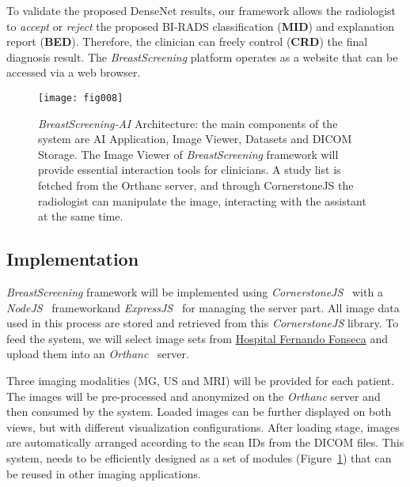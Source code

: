 To validate the proposed DenseNet results, our framework allows the radiologist to {\it accept} or {\it reject} the proposed BI-RADS classification ({\bf MID}) and explanation report ({\bf BED}).
Therefore, the clinician can freely control ({\bf CRD}) the final diagnosis result.
The {\it BreastScreening} platform operates as a website that can be accessed via a web browser.

\begin{figure}[htbp]
\centering
\texttt{[image: fig008]}
\caption{{\it BreastScreening-AI} Architecture: the main components of the system are AI Application, Image Viewer, Datasets and DICOM Storage. The Image Viewer of {\it BreastScreening} framework will provide essential interaction tools for clinicians. A study list is fetched from the Orthanc server, and through CornerstoneJS the radiologist can manipulate the image, interacting with the assistant at the same time.}
\label{fig:fig008}
\end{figure}

\subsection{Implementation}
\label{sec:sec00603}

{\it BreastScreening} framework will be implemented using {\it CornerstoneJS}\footnotemark[2]~\cite{urban2017lesiontracker} with a {\it NodeJS}~\cite{10.5555/3002437, drnasin2017javascript} framework\footnotemark[3] and {\it ExpressJS}\footnotemark[4]~\cite{10.1117/12.2285952} for managing the server part.
All image data used in this process are stored and retrieved from this {\it CornerstoneJS} library.
To feed the system, we will select image sets from \hyperlink{https://hff.min-saude.pt/}{Hospital Fernando Fonseca} and upload them into an {\it Orthanc}~\cite{Jodogne2018} server.

Three imaging modalities (MG, US and MRI) will be provided for each patient.
The images will be pre-processed and anonymized on the {\it Orthanc} server and then consumed by the system.
Loaded images can be further displayed on both views, but with different visualization configurations.
After loading stage, images are automatically arranged according to the scan IDs from the DICOM files.
This system, needs to be efficiently designed as a set of modules (Figure~\ref{fig:fig008}) that can be reused in other imaging applications.



